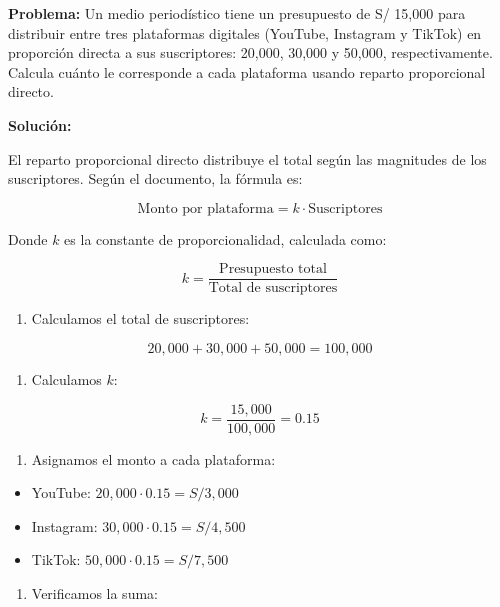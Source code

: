 \documentclass[
  stu,
  floatsintext,
  longtable,
  a4paper,
  nolmodern,
  notxfonts,
  notimes,
  colorlinks=true,linkcolor=blue,citecolor=blue,urlcolor=blue]{apa7}
\providecommand{\tightlist}{%
  \setlength{\itemsep}{0pt}\setlength{\parskip}{0pt}}
\begin{document}
\textbf{Problema:} Un medio periodístico tiene un presupuesto de S/
15,000 para distribuir entre tres plataformas digitales (YouTube,
Instagram y TikTok) en proporción directa a sus suscriptores: 20,000,
30,000 y 50,000, respectivamente. Calcula cuánto le corresponde a cada
plataforma usando reparto proporcional directo.

\textbf{Solución:}

El reparto proporcional directo distribuye el total según las magnitudes
de los suscriptores. Según el documento, la fórmula es:

\[
\text{Monto por plataforma} = k \cdot \text{Suscriptores}
\]

Donde \(k\) es la constante de proporcionalidad, calculada como:

\[
k = \frac{\text{Presupuesto total}}{\text{Total de suscriptores}}
\]

\begin{enumerate}
\def\labelenumi{\arabic{enumi}.}
\tightlist
\item
  Calculamos el total de suscriptores:
\end{enumerate}

\[
20,000 + 30,000 + 50,000 = 100,000
\]

\begin{enumerate}
\def\labelenumi{\arabic{enumi}.}
\setcounter{enumi}{1}
\tightlist
\item
  Calculamos \(k\):
\end{enumerate}

\[
k = \frac{15,000}{100,000} = 0.15
\]

\begin{enumerate}
\def\labelenumi{\arabic{enumi}.}
\setcounter{enumi}{2}
\tightlist
\item
  Asignamos el monto a cada plataforma:
\end{enumerate}

\begin{itemize}
\tightlist
\item
  YouTube: \(20,000 \cdot 0.15 = S/ 3,000\)
\item
  Instagram: \(30,000 \cdot 0.15 = S/ 4,500\)
\item
  TikTok: \(50,000 \cdot 0.15 = S/ 7,500\)
\end{itemize}

\begin{enumerate}
\def\labelenumi{\arabic{enumi}.}
\setcounter{enumi}{3}
\tightlist
\item
  Verificamos la suma:
\end{enumerate}
\end{document}
